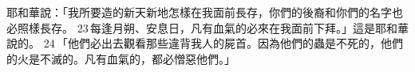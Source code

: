 耶和華說：「我所要造的新天新地怎樣在我面前長存，你們的後裔和你們的名字也必照樣長存。 23 每逢月朔、安息日，凡有血氣的必來在我面前下拜。」這是耶和華說的。 24 「他們必出去觀看那些違背我人的屍首。因為他們的蟲是不死的，他們的火是不滅的。凡有血氣的，都必憎惡他們。」
